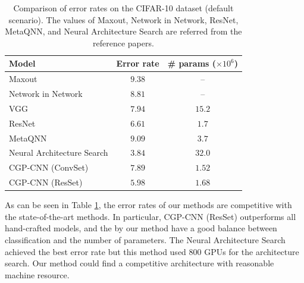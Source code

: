\begin{table}[t]
  \caption{Comparison of error rates on the CIFAR-10 dataset (default scenario). The values of Maxout, Network in Network, ResNet, MetaQNN, and Neural Architecture Search are referred from the reference papers.}
  \label{results}
  \begin{tabular}{l|c|c} \hline
   Model & Error rate & \# params ($\times 10^6$) \\ \hline
   Maxout \cite{goodfellow_maxout_2013} & $9.38$ & -- \\ 
   Network in Network \cite{lin_network_2014} & $8.81$ & -- \\
   VGG \cite{simonyan_very_2014} \footnotemark & $7.94$ & $15.2$ \\
   ResNet \cite{he_deep_2016} & $6.61$ & $1.7$ \\
   MetaQNN \cite{baker_designing_2016} \footnotemark & $9.09$ & $3.7$ \\
   Neural Architecture Search \cite{zoph_neural_2016} & $3.84$ & $32.0$ \\
   CGP-CNN (ConvSet) & $7.89$ & $1.52$ \\
   CGP-CNN (ResSet) & $5.98$ & $1.68$ \\ \hline
  \end{tabular}
\end{table}

As can be seen in Table \ref{results}, the error rates of our methods are competitive with the state-of-the-art methods.
In particular, CGP-CNN (ResSet) outperforms all hand-crafted models, and the  by  our method have a good balance between classification  and the number of parameters. The Neural Architecture Search achieved the best error rate\new{,} but this method used 800 GPUs for the architecture search. Our method could find a competitive architecture with  reasonable machine resource.

